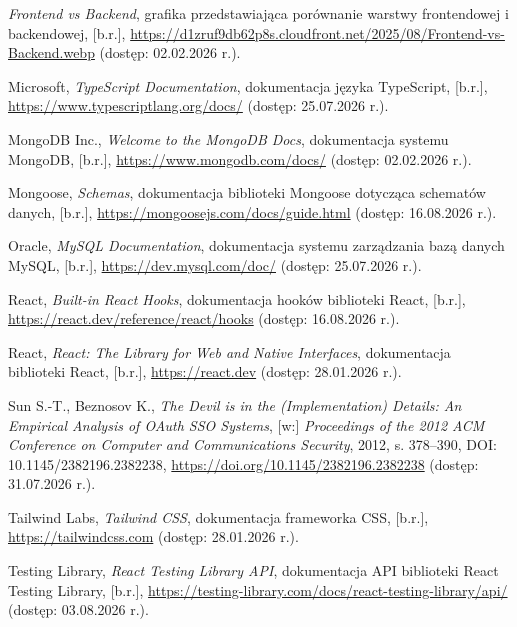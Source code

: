 \documentclass[12pt,a4paper]{article}
\begin{document}
\begin{list}{}{\setlength{\leftmargin}{0pt}\setlength{\itemindent}{0pt}\setlength{\labelwidth}{0pt}\setlength{\labelsep}{0pt}\setlength{\itemsep}{0.5\baselineskip}}
\item \emph{Frontend vs Backend}, grafika przedstawiająca porównanie warstwy frontendowej i backendowej, [b.r.], \url{https://d1zruf9db62p8s.cloudfront.net/2025/08/Frontend-vs-Backend.webp} (dostęp: 02.02.2026 r.).

\item Microsoft, \emph{TypeScript Documentation}, dokumentacja języka TypeScript, [b.r.], \url{https://www.typescriptlang.org/docs/} (dostęp: 25.07.2026 r.).

\item MongoDB Inc., \emph{Welcome to the MongoDB Docs}, dokumentacja systemu MongoDB, [b.r.], \url{https://www.mongodb.com/docs/} (dostęp: 02.02.2026 r.).

\item Mongoose, \emph{Schemas}, dokumentacja biblioteki Mongoose dotycząca schematów danych, [b.r.], \url{https://mongoosejs.com/docs/guide.html} (dostęp: 16.08.2026 r.).

\item Oracle, \emph{MySQL Documentation}, dokumentacja systemu zarządzania bazą danych MySQL, [b.r.], \url{https://dev.mysql.com/doc/} (dostęp: 25.07.2026 r.).

\item React, \emph{Built-in React Hooks}, dokumentacja hooków biblioteki React, [b.r.], \url{https://react.dev/reference/react/hooks} (dostęp: 16.08.2026 r.).

\item React, \emph{React: The Library for Web and Native Interfaces}, dokumentacja biblioteki React, [b.r.], \url{https://react.dev} (dostęp: 28.01.2026 r.).

\item Sun S.-T., Beznosov K., \emph{The Devil is in the (Implementation) Details: An Empirical Analysis of OAuth SSO Systems}, [w:] \emph{Proceedings of the 2012 ACM Conference on Computer and Communications Security}, 2012, s. 378--390, DOI: 10.1145/2382196.2382238, \url{https://doi.org/10.1145/2382196.2382238} (dostęp: 31.07.2026 r.).

\item Tailwind Labs, \emph{Tailwind CSS}, dokumentacja frameworka CSS, [b.r.], \url{https://tailwindcss.com} (dostęp: 28.01.2026 r.).

\item Testing Library, \emph{React Testing Library API}, dokumentacja API biblioteki React Testing Library, [b.r.], \url{https://testing-library.com/docs/react-testing-library/api/} (dostęp: 03.08.2026 r.).


\end{list}
\end{document}

